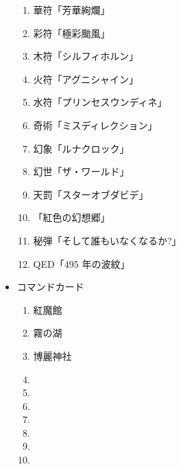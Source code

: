 \documentclass[line_length=22zw,number_of_lines=45,twocolumn]{jlreq}
\begin{document}
\begin{itemize}
\begin{enumerate}
			\item 華符「芳華絢爛」
			\item 彩符「極彩颱風」
			\item 木符「シルフィホルン」
			\item 火符「アグニシャイン」
			\item 水符「プリンセスウンディネ」
			\item 奇術「ミスディレクション」
			\item 幻象「ルナクロック」
			\item 幻世「ザ・ワールド」
			\item 天罰「スターオブダビデ」
			\item 「紅色の幻想郷」
			\item 秘弾「そして誰もいなくなるか?」
			\item QED「495 年の波紋」
		\end{enumerate}
	\item コマンドカード
		\begin{enumerate}
			\item 紅魔館
			\item 霧の湖
			\item 博麗神社
			\item 
			\item 
			\item 
			\item 
			\item 
			\item 
			\item 
		\end{enumerate}
\end{itemize}
\pagebreak
\end{document}
